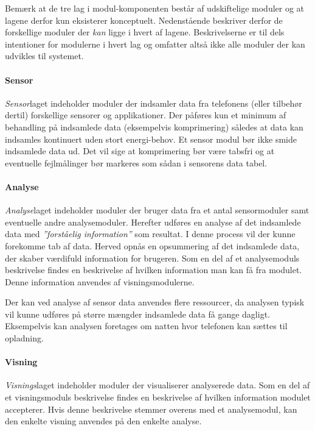 Bemærk at de tre lag i modul-komponenten består af udskiftelige moduler og at lagene derfor kun eksisterer konceptuelt. 
Nedenstående beskriver derfor de forskellige moduler der \textit{kan} ligge i hvert af lagene.
Beskrivelserne er til dels intentioner for modulerne i hvert lag og omfatter altså ikke alle moduler der kan udvikles til systemet.

\paragraph{Sensor}
\textit{Sensor}laget indeholder moduler der indsamler data fra telefonens (eller tilbehør dertil) forskellige sensorer og applikationer.
Der påføres kun et minimum af behandling på indsamlede data (eksempelvis komprimering) således at data kan indsamles kontinuert uden stort energi-behov.
Et sensor modul bør ikke smide indsamlede data ud.
Det vil sige at komprimering bør være tabsfri og at eventuelle fejlmålinger bør markeres som sådan i sensorens data tabel.

\paragraph{Analyse}
\textit{Analyse}laget indeholder moduler der bruger data fra et antal sensormoduler samt eventuelle andre analysemoduler.
Herefter udføres en analyse af det indsamlede data med \textit{''forståelig information''} som resultat.
I denne process vil der kunne forekomme tab af data.
Herved opnås en opsummering af det indsamlede data, der skaber værdifuld information for brugeren.
Som en del af et analysemoduls beskrivelse findes en beskrivelse af hvilken information man kan få fra modulet.
Denne information anvendes af visningsmodulerne.

Der kan ved analyse af sensor data anvendes flere ressourcer, da analysen typisk vil kunne udføres på større mængder indsamlede data få gange dagligt.
Eksempelvis kan analysen foretages om natten hvor telefonen kan sættes til opladning.

\paragraph{Visning}
\textit{Visnings}laget indeholder moduler der visualiserer analyserede data.
Som en del af et visningsmoduls beskrivelse findes en beskrivelse af hvilken information modulet accepterer.
Hvis denne beskrivelse stemmer overens med et analysemodul, kan den enkelte visning anvendes på den enkelte analyse.

